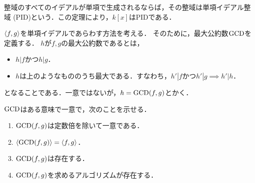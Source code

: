 \documentclass[9pt]{ltjsarticle}
\theoremstyle{break}
\theoremstyle{break}
\theoremstyle{break}
\theoremstyle{break}
\theoremstyle{break}
\theoremstyle{break}
\theoremstyle{break}
\theoremstyle{break}
\theoremstyle{break}
\theoremstyle{break}
\theoremstyle{break}
\theoremstyle{break}
\theoremstyle{break}
\theoremstyle{break}
\theoremstyle{break}
\theoremstyle{nonumberbreak}
\theoremstyle{nonumberbreak}
\begin{document}
整域のすべてのイデアルが単項で生成されるならば，その整域は単項イデアル整域
(PID)という．この定理により，$k[x]$はPIDである．

$\langle f,g \rangle$を単項イデアルであらわす方法を考える．
そのために，最大公約数${\rm GCD}$を定義する．
$h$が$f,g$の最大公約数であるとは，
\begin{itemize}
 \item $h|f$かつ$h|g$．
 \item $h$は上のようなもののうち最大である．すなわち，$h'|f かつ h'|g \implies h'|h$．
\end{itemize}
となることである．一意ではないが，$h={\rm GCD}(f,g)$とかく．

${\rm GCD}$はある意味で一意で，次のことを示せる．
\begin{enumerate}[label=(\arabic*)]
 \item ${\rm GCD}(f,g)$は定数倍を除いて一意である．
 \item $\langle {\rm GCD}(f,g) \rangle=\langle f,g \rangle$．
 \item ${\rm GCD}(f,g)$は存在する．
 \item ${\rm GCD}(f,g)$を求めるアルゴリズムが存在する．
\end{enumerate}
\end{document}
